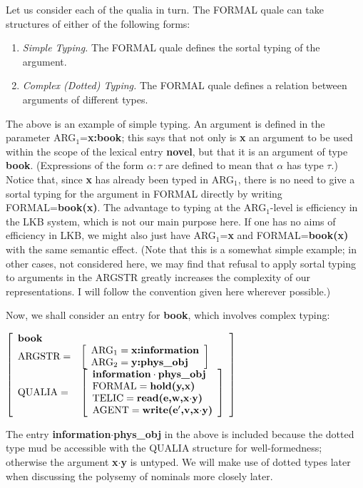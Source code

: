 \documentclass[12pt]{amsart}
\begin{document}
Let us consider each of the qualia in turn. The FORMAL quale can take structures of either of the following forms:
\begin{enumerate}
\item \emph{Simple Typing.} The FORMAL quale defines the sortal typing of the argument.
\item \emph{Complex (Dotted) Typing.} The FORMAL quale defines a relation between arguments of different types.
\end{enumerate}
The above is an example of simple typing. An argument is defined in the parameter ARG$_1$={\bf x:book}; this says that not only is {\bf x} an argument to be used within the scope of the lexical entry \textbf{novel}, but that it is an argument of type {\bf book}. (Expressions of the form $\alpha:\tau$ are defined to mean that $\alpha$ has type $\tau$.) Notice that, since {\bf x} has already been typed in ARG$_1$, there is no need to give a sortal typing for the argument in FORMAL directly by writing FORMAL={\bf book(x)}. The advantage to typing at the ARG$_1$-level is efficiency in the LKB system, which is not our main purpose here. If one has no aims of efficiency in LKB, we might also just have ARG$_1$={\bf x} and FORMAL={\bf book(x)} with the same semantic effect. (Note that this is a somewhat simple example; in other cases, not considered here, we may find that refusal to apply sortal typing to arguments in the ARGSTR greatly increases the complexity of our representations. I will follow the convention given here wherever possible.)

Now, we shall consider an entry for {\bf book}, which involves complex typing:
\par\vspace{5mm}
$\left[
\begin{array}{l l} 
\textbf{book} & \\
\text{ARGSTR} = & \left[ \begin{array}{l}
				\text{ARG}_1=\textbf{x:information} \\
				\text{ARG}_2=\textbf{y:phys\_obj} \\
				\end{array}\right] \\
\text{QUALIA} = & \left[ \begin{array}{l}
				\textbf{information}\cdot\textbf{phys\_obj} \\
				\text{FORMAL}=\textbf{hold(y,x)} \\
				\text{TELIC}=\textbf{read(e,w,x$\cdot$y)} \\
				\text{AGENT}=\textbf{write(e$^\prime$,v,x$\cdot$y)}
				\end{array}\right] \\
\end{array}
\right]$
\par\vspace{5mm}
The entry {\bf information$\cdot$phys\_obj} in the above is included because the dotted type mud be accessible with the QUALIA structure for well-formedness; otherwise the argument {\bf x$\cdot$y} is untyped. We will make use of dotted types later when discussing the polysemy of nominals more closely later.
\end{document}

